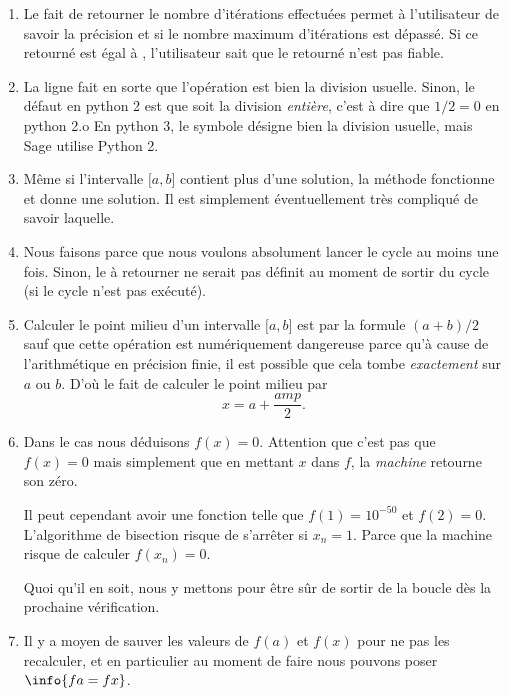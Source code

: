 \begin{enumerate}
    \item
Le fait de retourner le nombre d'itérations effectuées permet à l'utilisateur de savoir la précision et si le nombre maximum d'itérations est dépassé. Si ce  retourné est égal à , l'utilisateur sait que le  retourné n'est pas fiable.
\item
    La ligne  fait en sorte que l'opération \info{/} est bien la division usuelle. Sinon, le défaut en python 2 est que \info{/} soit la division \emph{entière}, c'est à dire que \( 1/2=0\) en python 2.o
    En python 3, le symbole \info{/} désigne bien la division usuelle, mais Sage utilise Python 2.
\item
    Même si l'intervalle \( \mathopen[ a , b \mathclose]\) contient plus d'une solution, la méthode fonctionne et donne une solution. Il est simplement éventuellement très compliqué de savoir laquelle.
\item
    Nous faisons  parce que nous voulons absolument lancer le cycle au moins une fois. Sinon, le  à retourner ne serait pas définit au moment de sortir du cycle (si le cycle n'est pas exécuté).
\item
    Calculer le point milieu d'un intervalle \( \mathopen[ a , b \mathclose]\) est par la formule \( (a+b)/2\) sauf que cette opération est numériquement dangereuse parce qu'à cause de l'arithmétique en précision finie, il est possible que cela tombe \emph{exactement} sur \( a\) ou \( b\). D'où le fait de calculer le point milieu par
    \begin{equation}
        x=a+\frac{ amp }{2}.
    \end{equation}
\item
    Dans le cas  nous déduisons \( f(x)=0\). Attention que c'est pas que \( f(x)=0\) mais simplement que en mettant \( x\) dans \( f\), la \emph{machine} retourne son zéro.

    Il peut cependant avoir une fonction telle que \( f(1)=10^{-50}\) et \( f(2)=0\). L'algorithme de bisection risque de s'arrêter si \( x_n=1\). Parce que la machine risque de calculer \( f(x_n)=0\).

    Quoi qu'il en soit, nous y mettons  pour être sûr de sortir de la boucle dès la prochaine vérification.
\item
    Il y a moyen de sauver les valeurs de \( f(a)\) et \( f(x)\) pour ne pas les recalculer, et en particulier au moment de faire  nous pouvons poser \(\info{fa=fx}\).
\end{enumerate}

